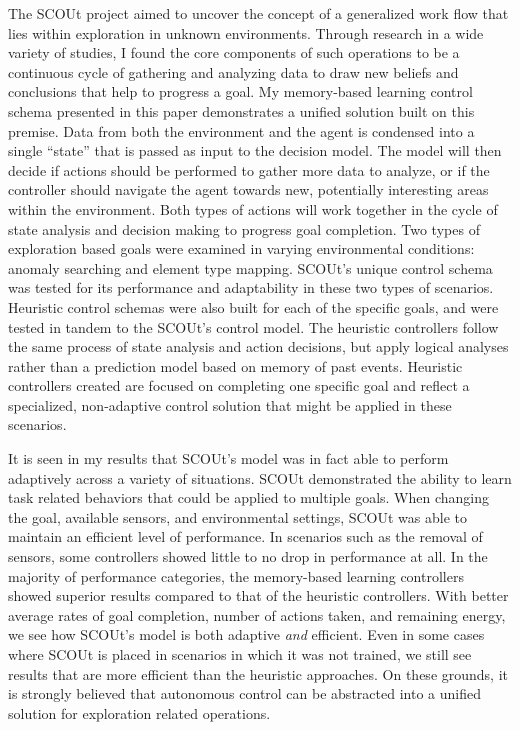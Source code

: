 The SCOUt project aimed to uncover the concept of a generalized work flow that lies within exploration in unknown environments.
Through research in a wide variety of studies, I found the core components of such operations to be a continuous cycle of gathering and analyzing data to draw new beliefs and conclusions that help to progress a goal.
My memory-based learning control schema presented in this paper demonstrates a unified solution built on this premise.
Data from both the environment and the agent is condensed into a single ``state'' that is passed as input to the decision model.
The model will then decide if actions should be performed to gather more data to analyze, or if the controller should navigate the agent towards new, potentially interesting areas within the environment.
Both types of actions will work together in the cycle of state analysis and decision making to progress goal completion.
Two types of exploration based goals were examined in varying environmental conditions: anomaly searching and element type mapping.
SCOUt's unique control schema was tested for its performance and adaptability in these two types of scenarios.
Heuristic control schemas were also built for each of the specific goals, and were tested in tandem to the SCOUt's control model.
The heuristic controllers follow the same process of state analysis and action decisions, but apply logical analyses rather than a prediction model based on memory of past events.
Heuristic controllers created are focused on completing one specific goal and reflect a specialized, non-adaptive control solution that might be applied in these scenarios.

It is seen in my results that SCOUt's model was in fact able to perform adaptively across a variety of situations.
SCOUt demonstrated the ability to learn task related behaviors that could be applied to multiple goals.
When changing the goal, available sensors, and environmental settings, SCOUt was able to maintain an efficient level of performance.
In scenarios such as the removal of sensors, some controllers showed little to no drop in performance at all.
In the majority of performance categories, the memory-based learning controllers showed superior results compared to that of the heuristic controllers.
With better average rates of goal completion, number of actions taken, and remaining energy, we see how SCOUt's model is both adaptive \textit{and} efficient.
Even in some cases where SCOUt is placed in scenarios in which it was not trained, we still see results that are more efficient than the heuristic approaches.
On these grounds, it is strongly believed that autonomous control can be abstracted into a unified solution for exploration related operations.

